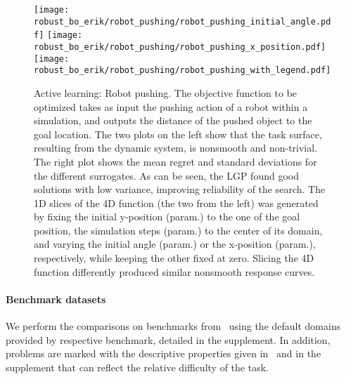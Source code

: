 \begin{figure}[t]
    \centering
    \texttt{[image: robust\_bo\_erik/robot\_pushing/robot\_pushing\_initial\_angle.pdf]}
    \texttt{[image: robust\_bo\_erik/robot\_pushing/robot\_pushing\_x\_position.pdf]}
    \texttt{[image: robust\_bo\_erik/robot\_pushing/robot\_pushing\_with\_legend.pdf]}
    \caption{
        Active learning: Robot pushing.
        The objective function to be optimized takes as input the pushing action of a robot within a simulation,
        and outputs the distance of the pushed object to the goal location.
        The two plots on the left show that the task surface, resulting from the dynamic system, is nonsmooth and non-trivial.
        The right plot shows the mean regret and standard deviations for the different surrogates.
        As can be seen, the LGP found good solutions with low variance, improving reliability of the search.
        The 1D slices of the 4D function (the two from the left) was generated by fixing the initial y-position (param.) to the one of the goal position,
        the simulation steps (param.) to the center of its domain, and varying the initial angle (param.) or the x-position (param.), respectively,
        while keeping the other fixed at zero.
        Slicing the 4D function differently produced similar nonsmooth response curves.\\
        \label{fig:bayesian_optimization:real_world}
    }
\end{figure}

\paragraph{Benchmark datasets}
We perform the comparisons on benchmarks from~\parencite{mccourt_optimization_2016,head_scikit-optimize_2018} using the default domains provided by respective benchmark, detailed in the supplement.
In addition, problems are marked with the descriptive properties given in~\parencite{mccourt_optimization_2016} and in the supplement that can reflect the relative difficulty of the task.

